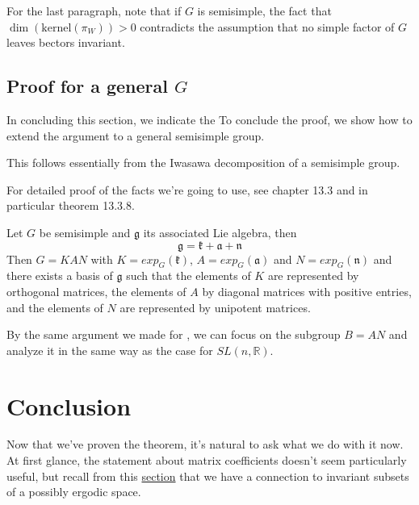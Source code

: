 \documentclass[
  12pt
]{article}
\theoremstyle{plain}
\newcommand{\G}{\ensuremath{G}\xspace}
\newcommand{\slnr}{\ensuremath{SL(n, \mathbb{R})}\xspace}
\newcommand{\frg}{\ensuremath{\mathfrak{g}}\xspace}
\newcommand{\frk}{\ensuremath{\mathfrak{k}}\xspace}
\newcommand{\fra}{\ensuremath{\mathfrak{a}}\xspace}
\newcommand{\frnn}{\ensuremath{\mathfrak{n}}\xspace}
\begin{document}
  For the last paragraph, note that if \G is semisimple, the fact that
  $\dim(\text{kernel}(\pi_W)) >0$ contradicts the assumption that no simple
  factor of \G leaves bectors invariant.




\hypertarget{proof-for-a-general-G}{%
\subsection{Proof for a general \texorpdfstring{$G$}{G}}\label{proof-for-a-general-G}}



   In concluding this section, we indicate the
   To conclude the proof, we show how to extend the argument to a general semisimple group.

   This follows essentially from the Iwasawa decomposition of a semisimple group.

   For detailed proof of the facts we're going to use, see \citeauthor{Hilgert2012}\cite{Hilgert2012} chapter 13.3 and in particular theorem 13.3.8.
   
   Let \G be semisimple and $\mathfrak{g}$ its associated Lie algebra, then 
   $$\frg = \frk + \fra + \frnn$$
   Then $G =KAN$ with $K=exp_G(\frk)$, $A=exp_G(\fra)$ and $N=exp_G(\frnn)$
   and there exists a basis of \frg such that the elements of $K$ are represented by orthogonal matrices, the elements of $A$ by diagonal matrices with positive entries, and the elements of $N$ are represented by unipotent matrices.

   By the same argument we made for , we can focus on the subgroup $B=AN$ and analyze it in the same way as the case for \slnr.




\hypertarget{outro}{%
\section{Conclusion}\label{outro}}


  Now that we've proven the theorem, it's natural to ask what we do with it now.
  At first glance, the statement about matrix coefficients doesn't seem particularly useful,
  but recall from this \hyperref[the-connection-between-ergodicity-and-unitary-representations]{section}
  that we have a connection to invariant subsets of a possibly ergodic space.
\end{document}
